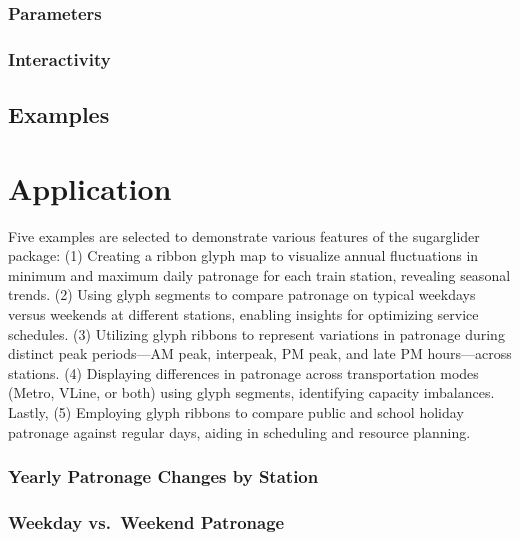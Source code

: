 \hypertarget{parameters}{%
\subsubsection{Parameters}\label{parameters}}

\hypertarget{interactivity}{%
\subsubsection{Interactivity}\label{interactivity}}

\hypertarget{examples}{%
\subsection{Examples}\label{examples}}

\hypertarget{application}{%
\section{Application}\label{application}}

Five examples are selected to demonstrate various features of the sugarglider package: (1) Creating a ribbon glyph map to visualize annual fluctuations in minimum and maximum daily patronage for each train station, revealing seasonal trends. (2) Using glyph segments to compare patronage on typical weekdays versus weekends at different stations, enabling insights for optimizing service schedules. (3) Utilizing glyph ribbons to represent variations in patronage during distinct peak periods---AM peak, interpeak, PM peak, and late PM hours---across stations. (4) Displaying differences in patronage across transportation modes (Metro, VLine, or both) using glyph segments, identifying capacity imbalances. Lastly, (5) Employing glyph ribbons to compare public and school holiday patronage against regular days, aiding in scheduling and resource planning.

\hypertarget{yearly-patronage-changes-by-station}{%
\subsubsection{Yearly Patronage Changes by Station}\label{yearly-patronage-changes-by-station}}

\hypertarget{weekday-vs.-weekend-patronage}{%
\subsubsection{Weekday vs.~Weekend Patronage}\label{weekday-vs.-weekend-patronage}}

